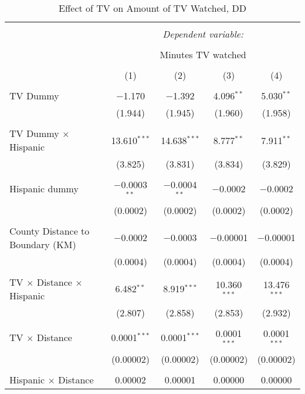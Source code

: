 
\begin{table}[!htbp] \centering 
  \caption{Effect of TV on Amount of TV Watched, DD} 
  \label{} 
\begin{tabular}{@{\extracolsep{-5pt}}lcccc} 
\\[-1.8ex]\hline 
\hline \\[-1.8ex] 
 & \multicolumn{4}{c}{\textit{Dependent variable:}} \\ 
\cline{2-5} 
\\[-1.8ex] & \multicolumn{4}{c}{Minutes TV watched} \\ 
\\[-1.8ex] & (1) & (2) & (3) & (4)\\ 
\hline \\[-1.8ex] 
 TV Dummy & $-$1.170 & $-$1.392 & 4.096$^{**}$ & 5.030$^{**}$ \\ 
  & (1.944) & (1.945) & (1.960) & (1.958) \\ 
  & & & & \\ 
 TV Dummy $\times$ Hispanic  & 13.610$^{***}$ & 14.638$^{***}$ & 8.777$^{**}$ & 7.911$^{**}$ \\ 
  & (3.825) & (3.831) & (3.834) & (3.829) \\ 
  & & & & \\ 
 Hispanic dummy & $-$0.0003$^{**}$ & $-$0.0004$^{**}$ & $-$0.0002 & $-$0.0002 \\ 
  & (0.0002) & (0.0002) & (0.0002) & (0.0002) \\ 
  & & & & \\ 
 County Distance to Boundary (KM) & $-$0.0002 & $-$0.0003 & $-$0.00001 & $-$0.00001 \\ 
  & (0.0004) & (0.0004) & (0.0004) & (0.0004) \\ 
  & & & & \\ 
 TV $\times$ Distance $\times$ Hispanic & 6.482$^{**}$ & 8.919$^{***}$ & 10.360$^{***}$ & 13.476$^{***}$ \\ 
  & (2.807) & (2.858) & (2.853) & (2.932) \\ 
  & & & & \\ 
 TV $\times$ Distance & 0.0001$^{***}$ & 0.0001$^{***}$ & 0.0001$^{***}$ & 0.0001$^{***}$ \\ 
  & (0.00002) & (0.00002) & (0.00002) & (0.00002) \\ 
  & & & & \\ 
 Hispanic $\times$ Distance & 0.00002 & 0.00001 & 0.00000 & 0.00000 \\ 

\end{tabular}
\end{table}
